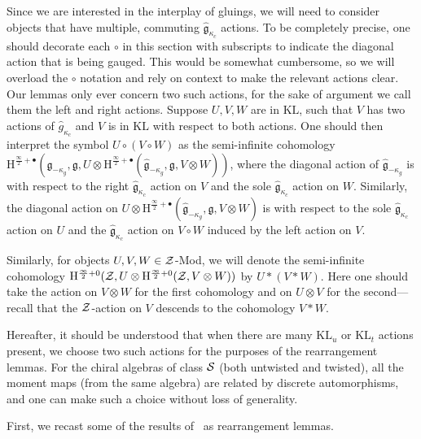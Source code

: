 \documentclass[a4paper]{article}
\def\SS{{\cal S}}
\def\ZZ{{\cal Z}}
\def\gf{\mathfrak{g}}
\def \KL{\mathrm{KL}}
\newcommand{\Hi}[1]{\mathrm{H}^{\frac{\infty}{2}+#1}}
\begin{document}
Since we are interested in the interplay of gluings, we will need to consider objects that have multiple, commuting $\hat{\gf}_{\kappa_c}$ actions. To be completely precise, one should decorate each $\circ$ in this section with subscripts to indicate the diagonal action that is being gauged. This would be somewhat cumbersome, so we will overload the $\circ$ notation and rely on context to make the relevant actions clear. Our lemmas only ever concern two such actions, for the sake of argument we call them the left and right actions. Suppose $U,V,W$ are in $\KL$, such that $V$ has two actions of $\hat{g}_{\kappa_c}$ and $V$ is in $\KL$ with respect to both actions. One should then interpret the symbol $U\circ(V\circ W)$ as the semi-infinite cohomology $\Hi{\bullet}(\hat{\gf}_{-\kappa_g},\gf,U\otimes\Hi{\bullet}(\hat{\gf}_{-\kappa_g},\gf,V\otimes W))$, where the diagonal action of $\hat{\gf}_{-\kappa_g}$ is with respect to the right $\hat{\gf}_{\kappa_c}$ action on $V$ and the sole $\hat{\gf}_{\kappa_c}$ action on $W$. Similarly, the diagonal action on $U\otimes \Hi{\bullet}(\hat{\gf}_{-\kappa_g},\gf,V\otimes W)$ is with respect to the sole $\hat{\gf}_{\kappa_c}$ action on $U$ and the $\hat{\gf}_{\kappa_c}$ action on $V\circ W$ induced by the left action on $V$.

Similarly, for objects $U,V,W\in\ZZ$-Mod, we will denote the semi-infinite cohomology $\Hi{0}(\ZZ,U\otimes\Hi{0}(\ZZ,V\otimes W))$ by $U\ast(V\ast W)$. Here one should take the action on $V\otimes W$ for the first cohomology and on $U\otimes V$ for the second---recall that the $\ZZ$-action on $V$ descends to the cohomology $V\ast W$.

Hereafter, it should be understood that when there are many $\KL_u$ or $\KL_t$ actions present, we choose two such actions for the purposes of the rearrangement lemmas. For the chiral algebras of class $\SS$ (both untwisted and twisted), all the moment maps (from the same algebra) are related by discrete automorphisms, and one can make such a choice without loss of generality.

First, we recast some of the results of~\cite{Arakawa:2018egx} as rearrangement lemmas.
\end{document}
